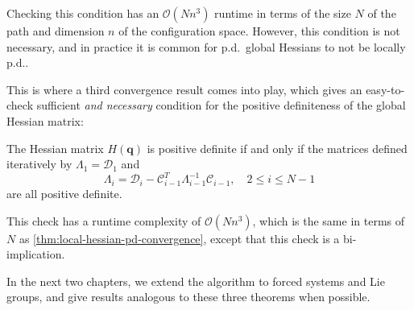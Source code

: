 Checking this condition has an $\mathcal{O}(N n^3)$ runtime in terms of the size $N$ of the path and dimension $n$ of the configuration space. However, this condition is not necessary, and in practice it is common for p.d.\ global Hessians to not be locally p.d..

This is where a third convergence result comes into play, which gives an easy-to-check sufficient \emph{and necessary} condition for the positive definiteness of the global Hessian matrix:

\begin{theorem}\label{thm:hessian-pd-criterion}
	The Hessian matrix $H(\mathbf{q})$ is positive definite if and only if the matrices defined iteratively by $\Lambda_1 = \mathcal{D}_1$ and
	\[ \Lambda_i = \mathcal{D}_i - \mathcal{C}_{i-1}^T \Lambda_{i-1}^{-1} \mathcal{C}_{i-1}, \quad 2 \leq i \leq N - 1 \]
	are all positive definite.
\end{theorem}
This check has a runtime complexity of $\mathcal{O}(N n^3)$, which is the same in terms of $N$ as \cref{thm:local-hessian-pd-convergence}, except that this check is a bi-implication.

\bigskip

In the next two chapters, we extend the algorithm to forced systems and Lie groups, and give results analogous to these three theorems when possible.

